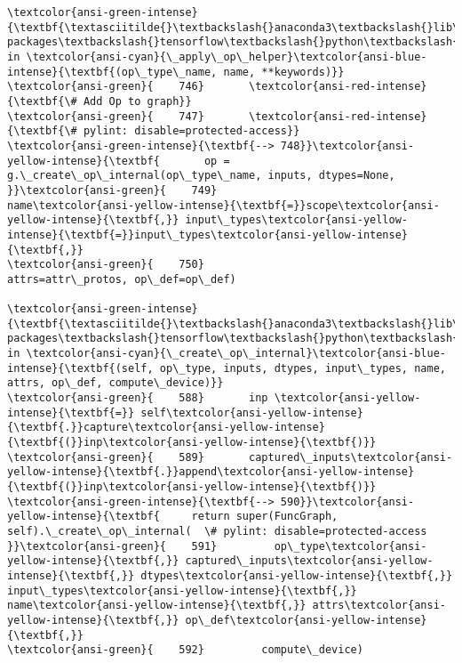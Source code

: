 \documentclass[11pt]{article}
\begin{document}
\begin{Verbatim}[commandchars=\\\{\}, frame=single, framerule=2mm, rulecolor=\color{outerrorbackground}]
\textcolor{ansi-green-intense}{\textbf{\textasciitilde{}\textbackslash{}anaconda3\textbackslash{}lib\textbackslash{}site-packages\textbackslash{}tensorflow\textbackslash{}python\textbackslash{}framework\textbackslash{}op\_def\_library.py}} in \textcolor{ansi-cyan}{\_apply\_op\_helper}\textcolor{ansi-blue-intense}{\textbf{(op\_type\_name, name, **keywords)}}
\textcolor{ansi-green}{    746}       \textcolor{ansi-red-intense}{\textbf{\# Add Op to graph}}
\textcolor{ansi-green}{    747}       \textcolor{ansi-red-intense}{\textbf{\# pylint: disable=protected-access}}
\textcolor{ansi-green-intense}{\textbf{--> 748}}\textcolor{ansi-yellow-intense}{\textbf{       op = g.\_create\_op\_internal(op\_type\_name, inputs, dtypes=None,
}}\textcolor{ansi-green}{    749}                                  name\textcolor{ansi-yellow-intense}{\textbf{=}}scope\textcolor{ansi-yellow-intense}{\textbf{,}} input\_types\textcolor{ansi-yellow-intense}{\textbf{=}}input\_types\textcolor{ansi-yellow-intense}{\textbf{,}}
\textcolor{ansi-green}{    750}                                  attrs=attr\_protos, op\_def=op\_def)

\textcolor{ansi-green-intense}{\textbf{\textasciitilde{}\textbackslash{}anaconda3\textbackslash{}lib\textbackslash{}site-packages\textbackslash{}tensorflow\textbackslash{}python\textbackslash{}framework\textbackslash{}func\_graph.py}} in \textcolor{ansi-cyan}{\_create\_op\_internal}\textcolor{ansi-blue-intense}{\textbf{(self, op\_type, inputs, dtypes, input\_types, name, attrs, op\_def, compute\_device)}}
\textcolor{ansi-green}{    588}       inp \textcolor{ansi-yellow-intense}{\textbf{=}} self\textcolor{ansi-yellow-intense}{\textbf{.}}capture\textcolor{ansi-yellow-intense}{\textbf{(}}inp\textcolor{ansi-yellow-intense}{\textbf{)}}
\textcolor{ansi-green}{    589}       captured\_inputs\textcolor{ansi-yellow-intense}{\textbf{.}}append\textcolor{ansi-yellow-intense}{\textbf{(}}inp\textcolor{ansi-yellow-intense}{\textbf{)}}
\textcolor{ansi-green-intense}{\textbf{--> 590}}\textcolor{ansi-yellow-intense}{\textbf{     return super(FuncGraph, self).\_create\_op\_internal(  \# pylint: disable=protected-access
}}\textcolor{ansi-green}{    591}         op\_type\textcolor{ansi-yellow-intense}{\textbf{,}} captured\_inputs\textcolor{ansi-yellow-intense}{\textbf{,}} dtypes\textcolor{ansi-yellow-intense}{\textbf{,}} input\_types\textcolor{ansi-yellow-intense}{\textbf{,}} name\textcolor{ansi-yellow-intense}{\textbf{,}} attrs\textcolor{ansi-yellow-intense}{\textbf{,}} op\_def\textcolor{ansi-yellow-intense}{\textbf{,}}
\textcolor{ansi-green}{    592}         compute\_device)


\end{Verbatim}
\end{document}
